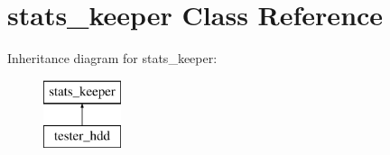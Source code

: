 \hypertarget{classstats__keeper}{
\section{stats\_\-keeper Class Reference}
\label{classstats__keeper}
}
Inheritance diagram for stats\_\-keeper:\begin{figure}[H]
\begin{center}
\leavevmode
\includegraphics[height=2cm]{classstats__keeper}
\end{center}
\end{figure}
